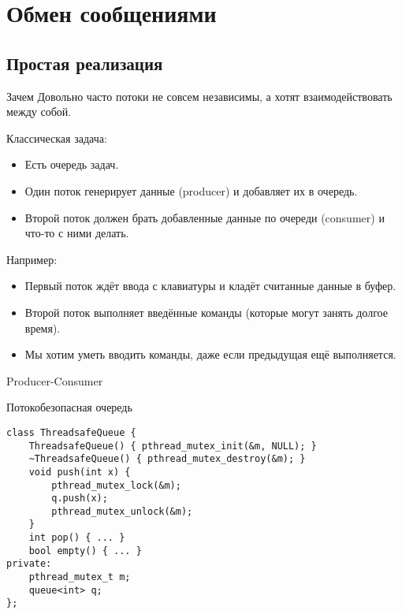 \section{Обмен сообщениями}
\subsection{Простая реализация}

\begin{frame}
\end{frame}

\begin{frame}{Зачем}
	Довольно часто потоки не совсем независимы, а хотят взаимодействовать между собой.

	Классическая задача:
	\begin{itemize}
		\item Есть очередь задач.
		\item Один поток генерирует данные (producer) и добавляет их в очередь.
		\item Второй поток должен брать добавленные данные по очереди (consumer) и что-то с ними делать.
	\end{itemize}
	Например:
	\begin{itemize}
		\item Первый поток ждёт ввода с клавиатуры и кладёт считанные данные в буфер.
		\item Второй поток выполняет введённые команды (которые могут занять долгое время).
		\item Мы хотим уметь вводить команды, даже если предыдущая ещё выполняется.
	\end{itemize}
\end{frame}

\begin{frame}{Producer-Consumer}
\end{frame}

\begin{frame}[fragile]{Потокобезопасная очередь}
\begin{verbatim}
class ThreadsafeQueue {
    ThreadsafeQueue() { pthread_mutex_init(&m, NULL); }
    ~ThreadsafeQueue() { pthread_mutex_destroy(&m); }
    void push(int x) {
        pthread_mutex_lock(&m);
        q.push(x);
        pthread_mutex_unlock(&m);
    }
    int pop() { ... }
    bool empty() { ... }
private:
    pthread_mutex_t m;
    queue<int> q;
};
\end{verbatim}
\end{frame}

